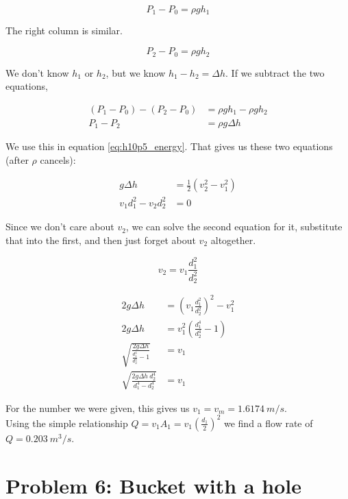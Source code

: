 \documentclass[8.01x]{subfiles}
\begin{document}
\begin{equation}
P_1 - P_0 = \rho g h_1
\end{equation}

The right column is similar.

\begin{equation}
P_2 - P_0 = \rho g h_2
\end{equation}

We don't know $h_1$ or $h_2$, but we know $h_1 - h_2= \Delta h$. If we subtract the two equations,

\begin{align}
(P_1 - P_0) - (P_2 - P_0) &= \rho g h_1 - \rho g h_2\\
P_1 - P_2 &= \rho g \Delta h
\end{align}

We use this in equation \eqref{eq:h10p5_energy}. That gives us these two equations (after $\rho$ cancels):

\begin{align}
g \Delta h &= \frac{1}{2} \left(v_2^2 - v_1^2\right)\\
v_1 d_1^2 - v_2 d_2^2 &= 0
\end{align}

Since we don't care about $v_2$, we can solve the second equation for it, substitute that into the first, and then just forget about $v_2$ altogether.

\begin{equation}
v_2 = v_1 \frac{d_1^2}{d_2^2}
\end{equation}

\begin{align}
2 g \Delta h &= \left(v_1 \frac{d_1^2}{d_2^2}\right)^2 - v_1^2\\
2 g \Delta h &= v_1^2 \left(\frac{d_1^4}{d_2^4} - 1\right)\\
\sqrt{\frac{2 g \Delta h}{\frac{d_1^4}{d_2^4} - 1}} &= v_1\\
\sqrt{\frac{2 g \Delta h\ d_2^4}{d_1^4 - d_2^4}} &= v_1
\end{align}

For the number we were given, this gives us $v_1 = v_m = \SI{1.6174}{m/s}$.\\
Using the simple relationship $\displaystyle Q = v_1 A_1  = v_1 \left(\frac{d_1}{2}\right)^2$ we find a flow rate of $Q = \SI{0.203}{m^3/s}$.

\section{Problem 6: Bucket with a hole}
\end{document}
